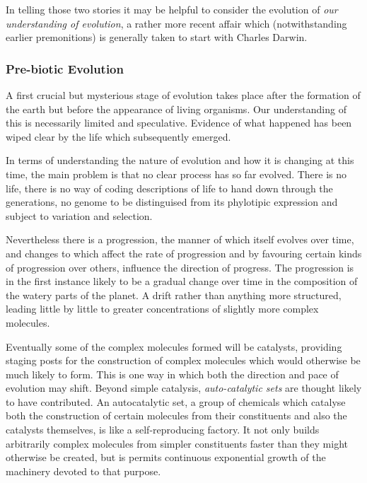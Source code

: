 \documentclass[10pt,titlepage]{book}
\begin{document}
In telling those two stories it may be helpful to consider the evolution of \emph{our understanding of evolution}, a rather more recent affair which (notwithstanding earlier premonitions) is generally taken to start with Charles Darwin\cite{darwin-oos}.

  \subsubsection{Pre-biotic Evolution}

  A first crucial but mysterious stage of evolution takes place after the formation of the earth but before the appearance of living organisms.
  Our understanding of this is necessarily limited and speculative.
  Evidence of what happened has been wiped clear by the life which subsequently emerged.

  In terms of understanding the nature of evolution and how it is changing at this time, the main problem is that no clear process has so far evolved.
  There is no life, there is no way of coding descriptions of life to hand down through the generations, no genome to be distinguised from its phylotipic expression and subject to variation and selection.

  Nevertheless there is a progression, the manner of which itself evolves over time, and changes to which affect the rate of progression and by favouring certain kinds of progression over others, influence the direction of progress.
  The progression is in the first instance likely to be a gradual change over time in the composition of the watery parts of the planet.
  A drift rather than anything more structured, leading little by little to greater concentrations of slightly more complex molecules.

  Eventually some of the complex molecules formed will be catalysts, providing staging posts for the construction of complex molecules which would otherwise be much likely to form.
  This is one way in which both the direction and pace of evolution may shift.
  Beyond simple catalysis, \emph{auto-catalytic sets} are thought likely to have contributed.
  An autocatalytic set, a group of chemicals which catalyse both the construction of certain molecules from their constituents and also the catalysts themselves, is like a self-reproducing factory.
  It not only builds arbitrarily complex molecules from simpler constituents faster than they might otherwise be created, but is permits continuous exponential growth of the machinery devoted to that purpose.
\end{document}
